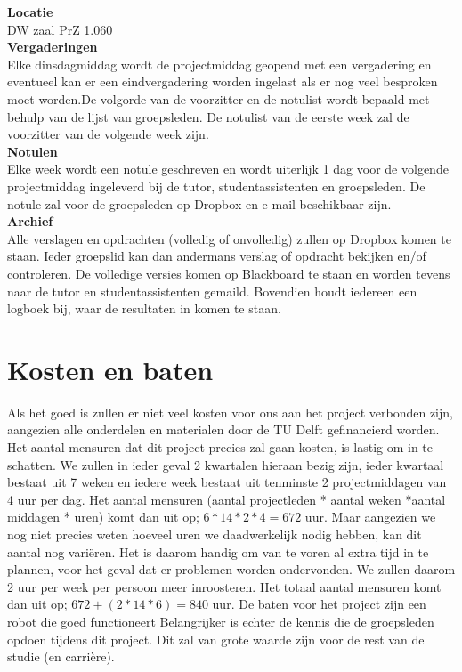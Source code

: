 \documentclass[11pt]{article}
\begin{document}
\noindent \textbf{Locatie}\\
DW zaal PrZ 1.060\\

\noindent \textbf{Vergaderingen}\\
Elke dinsdagmiddag wordt de projectmiddag geopend met een vergadering en eventueel kan er een eindvergadering worden ingelast als er nog veel besproken moet worden.De volgorde van de voorzitter en de notulist wordt bepaald met behulp van de lijst van groepsleden. De notulist van de eerste week zal de voorzitter van de volgende week zijn.\\

\noindent \textbf{Notulen}\\
Elke week wordt een notule geschreven en wordt uiterlijk 1 dag voor de volgende projectmiddag ingeleverd bij de tutor, studentassistenten en groepsleden. De notule zal voor de groepsleden op Dropbox en e-mail beschikbaar zijn.\\

\noindent \textbf{Archief}\\
Alle verslagen en opdrachten (volledig of onvolledig) zullen op Dropbox komen te staan. Ieder groepslid kan dan andermans verslag of opdracht bekijken en/of controleren. De volledige versies komen op Blackboard te staan en worden tevens naar de tutor en studentassistenten gemaild. Bovendien houdt iedereen een logboek bij, waar de resultaten in komen te staan. 

\newpage
\section{Kosten en baten}
Als het goed is zullen er niet veel kosten voor ons aan het project verbonden zijn, aangezien alle onderdelen en materialen door de TU Delft gefinancierd worden.
Het aantal mensuren dat dit project precies zal gaan kosten, is lastig om in te schatten. We zullen in ieder geval 2 kwartalen hieraan bezig zijn, ieder kwartaal bestaat uit 7 weken en iedere week bestaat uit tenminste 2 projectmiddagen van 4 uur per dag.
Het aantal mensuren (aantal projectleden * aantal weken *aantal middagen * uren) komt dan uit op; $6*14*2*4= 672$ uur.
Maar aangezien we nog niet precies weten hoeveel uren we daadwerkelijk nodig hebben, kan dit aantal nog variëren. Het is daarom handig om van te voren al extra tijd in te plannen, voor het geval dat er problemen worden ondervonden. We zullen daarom 2 uur per week per persoon meer inroosteren. Het totaal aantal mensuren komt dan uit op; $672 + (2*14*6) = 840$ uur.
De baten voor het project zijn een robot die goed functioneert Belangrijker  is echter de kennis die de groepsleden opdoen tijdens dit project. Dit zal van grote waarde zijn voor de rest van de studie (en carrière).
\end{document}
